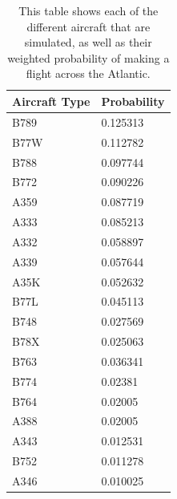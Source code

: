 \documentclass[stu, a4paper, 12pt, floatsintext]{apa7}
\numberwithin{figure}{section}
\numberwithin{table}{section}
\numberwithin{equation}{section}
\begin{document}
\begin{table}[H]
    \centering
    \caption{This table shows each of the different aircraft that are simulated, as well as their weighted probability of making a flight across the Atlantic.}
    \label{tab:21}
    \begin{tabular}{@{}ll@{}}
    \toprule
    \multicolumn{1}{c}{\textbf{Aircraft Type}} & \multicolumn{1}{c}{\textbf{Probability}} \\ \midrule
    B789                                       & 0.125313                                 \\
    B77W                                       & 0.112782                                 \\
    B788                                       & 0.097744                                 \\
    B772                                       & 0.090226                                 \\
    A359                                       & 0.087719                                 \\
    A333                                       & 0.085213                                 \\
    A332                                       & 0.058897                                 \\
    A339                                       & 0.057644                                 \\
    A35K                                       & 0.052632                                 \\
    B77L                                       & 0.045113                                 \\
    B748                                       & 0.027569                                 \\
    B78X                                       & 0.025063                                 \\
    B763                                       & 0.036341                                 \\
    B774                                       & 0.02381                                  \\
    B764                                       & 0.02005                                  \\
    A388                                       & 0.02005                                  \\
    A343                                       & 0.012531                                 \\
    B752                                       & 0.011278                                 \\
    A346                                       & 0.010025                                 \\ \bottomrule
    \end{tabular}
\end{table}
\end{document}
